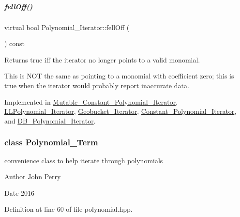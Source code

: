 \mbox{\label{group___iterator_group_ac571e120134088d6067718bbad513e2d}} 
\subparagraph{\texorpdfstring{fell\+Off()}{fellOff()}}
{\footnotesize\ttfamily virtual bool Polynomial\+\_\+\+Iterator\+::fell\+Off (\begin{DoxyParamCaption}{ }\end{DoxyParamCaption}) const\hspace{0.3cm}{\ttfamily [pure virtual]}}

\begin{DoxyReturn}{Returns}
true iff the iterator no longer points to a valid monomial.
\end{DoxyReturn}
This is N\+OT the same as pointing to a monomial with coefficient zero; this is true when the iterator would probably report inaccurate data. 

Implemented in \hyperlink{group___iterator_group_a4c7718296e7be3e5c2b942fa71dd69f2}{Mutable\+\_\+\+Constant\+\_\+\+Polynomial\+\_\+\+Iterator}, \hyperlink{group___iterator_group_ab6471b426bf5645dacd2369c0ab441f5}{L\+L\+Polynomial\+\_\+\+Iterator}, \hyperlink{group___iterator_group_a44ac71c5f71fc2830c74c4d289c9aec8}{Geobucket\+\_\+\+Iterator}, \hyperlink{group___iterator_group_a1b87a857220a97fe403c5164a51f86eb}{Constant\+\_\+\+Polynomial\+\_\+\+Iterator}, and \hyperlink{group___iterator_group_aa5ee700b0d03a9e333f55a87b2439920}{D\+B\+\_\+\+Polynomial\+\_\+\+Iterator}.

\label{class_polynomial___term}
\subsubsection{class Polynomial\+\_\+\+Term}
convenience class to help iterate through polynomials 

\begin{DoxyAuthor}{Author}
John Perry 
\end{DoxyAuthor}
\begin{DoxyDate}{Date}
2016 
\end{DoxyDate}


Definition at line 60 of file polynomial.\+hpp.

